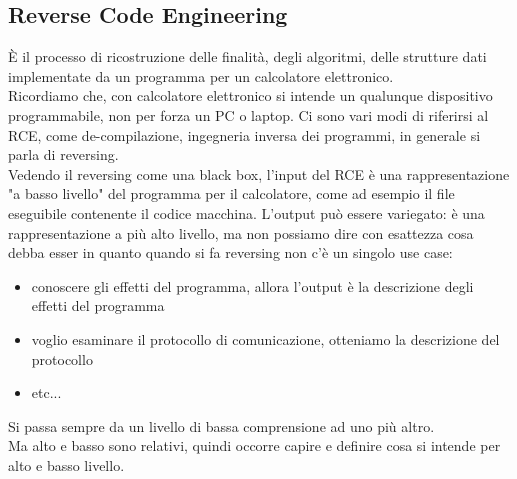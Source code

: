 \documentclass[12pt, oneside]{extbook}
\begin{document}
\subsection{Reverse Code Engineering}
È il processo di ricostruzione delle finalità, degli algoritmi, delle strutture dati implementate da un programma per un calcolatore elettronico.\\ Ricordiamo che, con calcolatore elettronico si intende un qualunque dispositivo programmabile, non per forza un PC o laptop. Ci sono vari modi di riferirsi al RCE, come de-compilazione, ingegneria inversa dei programmi, in generale si parla di reversing.\\ Vedendo il reversing come una black box, l'input del RCE è una rappresentazione "a basso livello" del programma per il calcolatore, come ad esempio il file eseguibile contenente il codice macchina. L'output può essere variegato: è una rappresentazione a più alto livello, ma non possiamo dire con esattezza cosa debba esser in quanto quando si fa reversing non c'è un singolo use case:
\begin{itemize}
\item conoscere gli effetti del programma, allora l'output è la descrizione degli effetti del programma
\item voglio esaminare il protocollo di comunicazione, otteniamo la descrizione del protocollo
\item etc...
\end{itemize}
Si passa sempre da un livello di bassa comprensione ad uno più altro.\\ Ma alto e basso sono relativi, quindi occorre capire e definire cosa si intende per alto e basso livello.
\end{document}
